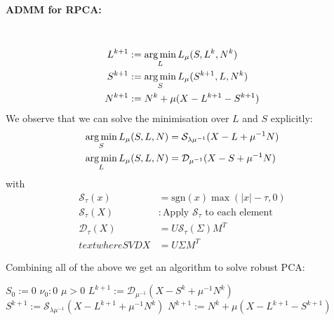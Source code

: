 \paragraph{ADMM for RPCA:} \
\begin{align*}
    L^{k+1} &:= \operatorname*{arg\,min}_L L_\mu(S,L^k,N^k)\\
    S^{k+1} &:= \operatorname*{arg\,min}_S L_\mu(S^{k+1}, L,N^k)\\
    N^{k+1} &:= N^k +\mu(X-L^{k+1}-S^{k+1})
\end{align*}
We observe that we can solve the minimisation over $L$ and $S$ explicitly:
\begin{align*}
    \operatorname*{arg\,min}_S L_\mu (S,L,N) &=\mathcal S_{\lambda \mu^{-1}} (X-L+\mu^{-1}N)\\
    \operatorname*{arg\,min}_L L_\mu (S,L,N) &=\mathcal D_{\mu^{-1}}(X-S+\mu^{-1}N)
\end{align*}
with
\begin{align*}
    \mathcal S_\tau(x) &= \text{sgn}(x)\max(|x|-\tau,0)\\
    \mathcal S_\tau(X) &: \text{Apply $\mathcal S_\tau$ to each element}\\
    \mathcal D_\tau(X) &= U\mathcal S_\tau (\Sigma) M^T\\
    text{where SVD } X &= U\Sigma M^T
\end{align*}

Combining all of the above we get an algorithm to solve robust PCA:


\begin{algorithmic}
    \STATE $S_0:= 0$
    \STATE $\nu_0 :0$
    \STATE $\mu > 0$
        \STATE $L^{k+1} := \mathcal D_{\mu^{-1}} (X-S^k + \mu^{-1} N^k)$
        \STATE $S^{k+1} := \mathcal S_{\lambda \mu^{-1}} (X-L^{k+1} +\mu^{-1} N^k)$
        \STATE $N^{k+1} := N^k +\mu(X-L^{k+1}-S^{k+1})$
    \ENDWHILE
\end{algorithmic}










 

























